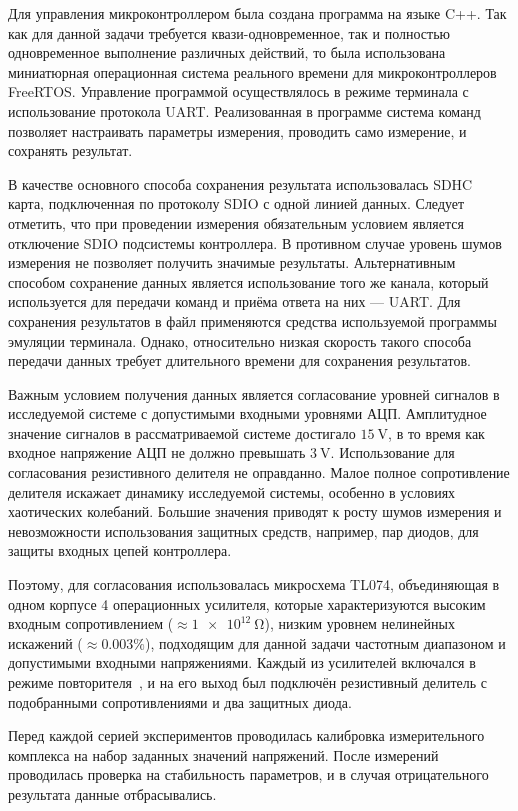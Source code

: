 Для управления микроконтроллером была создана программа
на языке C++. Так как для данной задачи требуется
квази-одновременное, так и полностью одновременное выполнение
различных действий, то была использована миниатюрная операционная
система реального времени для микроконтроллеров FreeRTOS.
Управление программой осуществлялось в режиме терминала
с использование протокола UART. Реализованная
в программе система команд позволяет настраивать параметры измерения,
проводить само измерение, и сохранять результат.

В качестве основного способа сохранения результата
использовалась SDHC карта, подключенная по протоколу SDIO с одной линией данных.
Следует отметить, что при проведении измерения обязательным условием
является отключение SDIO подсистемы контроллера.
В противном случае уровень шумов измерения не позволяет
получить значимые результаты.
Альтернативным способом сохранение данных является
использование того же канала, который используется для передачи команд
и приёма ответа на них --- UART. Для сохранения результатов в файл
применяются средства используемой программы эмуляции терминала.
Однако, относительно низкая скорость такого способа передачи данных
требует длительного времени для сохранения результатов.

Важным условием получения данных является согласование уровней
сигналов в исследуемой системе с допустимыми входными уровнями АЦП.
Амплитудное значение сигналов в рассматриваемой системе достигало
$\SI{15}{\volt}$, в то время как входное напряжение АЦП не должно
превышать $\SI{3}{\volt}$.
Использование для согласования резистивного делителя
не оправданно. Малое полное сопротивление делителя
искажает динамику исследуемой системы, особенно в условиях
хаотических колебаний. Большие значения приводят
к росту шумов измерения и невозможности
использования защитных средств, например, пар диодов,
для защиты входных цепей контроллера.

Поэтому, для согласования использовалась микросхема TL074,
объединяющая в одном корпусе 4 операционных усилителя,
которые характеризуются высоким входным сопротивлением ($\approx \SI{1e12}{\ohm}$),
низким уровнем нелинейных искажений ($\approx 0.003\%$),
подходящим для данной задачи частотным диапазоном
и допустимыми входными напряжениями.
Каждый из усилителей включался в режиме повторителя~\cite{horowitz},
и на его выход был подключён резистивный делитель
с подобранными сопротивлениями и два защитных диода.

Перед каждой серией экспериментов проводилась калибровка
измерительного комплекса на набор заданных значений напряжений.
После измерений проводилась проверка на стабильность
параметров, и в случая отрицательного результата
данные отбрасывались.


